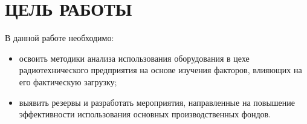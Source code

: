 \section{ЦЕЛЬ РАБОТЫ}

В данной работе необходимо:

\begin{itemize}
  \item освоить методики анализа использования оборудования в цехе радиотехнического
    предприятия на основе изучения факторов, влияющих на его фактическую загрузку;
  \item выявить резервы и разработать мероприятия, направленные на повышение
    эффективности использования основных производственных фондов.
\end{itemize}

\newpage
